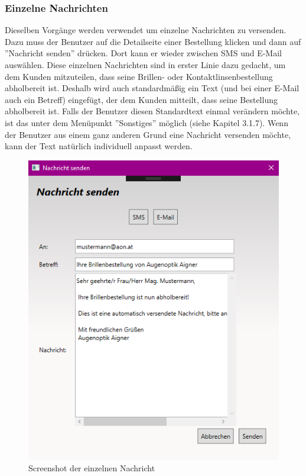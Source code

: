 \subsubsection{Einzelne Nachrichten}
\smallskip
Dieselben Vorgänge werden verwendet um einzelne Nachrichten zu versenden. Dazu muss der Benutzer auf die Detailseite einer Bestellung klicken und dann auf ''Nachricht senden'' drücken. Dort kann er wieder zwischen SMS und E-Mail auswählen. \newline Diese einzelnen Nachrichten sind in erster Linie dazu gedacht, um dem Kunden mitzuteilen, dass seine Brillen- oder Kontaktlinsenbestellung abholbereit ist. Deshalb wird auch standardmäßig ein Text (und bei einer E-Mail auch ein Betreff) eingefügt, der dem Kunden mitteilt, dass seine Bestellung abholbereit ist. Falls der Benutzer diesen Standardtext einmal verändern möchte, ist das unter dem Menüpunkt ''Sonstiges'' möglich (siehe Kapitel 3.1.7). \newline Wenn der Benutzer aus einem ganz anderen Grund eine Nachricht versenden möchte, kann der Text natürlich individuell anpasst werden.
\begin{figure}[H]
\begin{center}
	\includegraphics[scale=.6]{images/EinzelneNachricht.png}
\end{center}
	\caption{Screenshot der einzelnen Nachricht}
	\label{fig:sample}
\end{figure}
